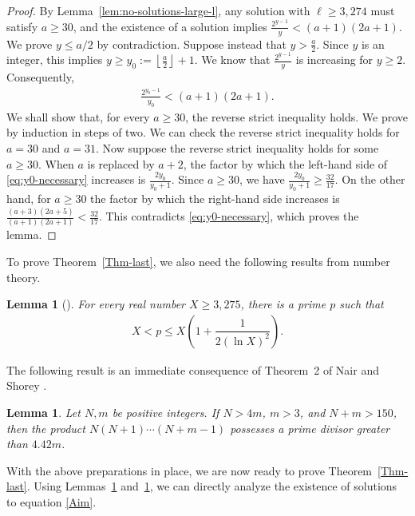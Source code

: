 \documentclass[11pt]{article}
\newtheorem{lem}[thm]{Lemma}
\begin{document}
\begin{proof}
By Lemma~\ref{lem:no-solutions-large-l}, any solution with $\ell\ge 3{,}274$ must satisfy
$a\ge30$, and the existence of a solution implies
$\frac{2^{y-1}}{y}<(a+1)(2a+1)$.
We prove \(y\le a/2\) by contradiction. Suppose instead that $y>\frac{a}{2}$.
Since $y$ is an integer, this implies
$y\ge y_0:=\left\lfloor\frac{a}{2}\right\rfloor+1$.
We know that $\frac{2^{y-1}}{y}$ is increasing for $y\ge 2$.
Consequently,
\begin{align}
    \frac{2^{y_0-1}}{y_0}
<
(a+1)(2a+1).\label{eq:y0-necessary}
\end{align}
We shall show that, for every $a\ge30$, the reverse strict inequality
holds.
We prove by induction in steps of two. 
We can check the reverse strict inequality holds for $a=30$ and $a=31$.
Now suppose the reverse strict inequality holds for some $a\ge30$.
When $a$ is replaced by $a+2$,
the factor by which the left-hand side of \eqref{eq:y0-necessary} increases is $\frac{2y_0}{y_0+1}$.
Since $a\ge30$, we have  $\frac{2y_0}{y_0+1}
\ge
\frac{32}{17}$.
On the other hand, for $a\ge 30$ the factor by which the right-hand side increases is
$\frac{(a+3)(2a+5)}{(a+1)(2a+1)}<
\frac{32}{17}$.
This contradicts \eqref{eq:y0-necessary}, which proves the lemma.
\end{proof}
To prove Theorem~\ref{Thm-last}, we also need the following results from number theory.
\begin{lem}[{\cite[Theorem 1.9]{Dusart1998}}]\label{lem-number-1}
For every real number $X\ge3{,}275$, there is a prime $p$ such that
\begin{align*}
X<p\le X\left(1+\dfrac1{2(\ln X)^2} \right).    
\end{align*}
\end{lem}

The following result is an immediate consequence of Theorem~2 of Nair and Shorey \cite{NairShorey2016}.
\begin{lem}\label{lem-number-2}
Let $N,m$ be positive integers. If $N>4m$, $m>3$, and $N+m>150$,
then the product $N(N+1)\cdots(N+m-1)$ possesses a prime divisor greater than $4.42m$.
\end{lem}

With the above preparations in place, we are now ready to prove Theorem~\ref{Thm-last}. Using Lemmas~\ref{lem-number-1} and~\ref{lem-number-2}, 
we can directly analyze the existence of solutions to equation \eqref{Aim}.
\end{document}
